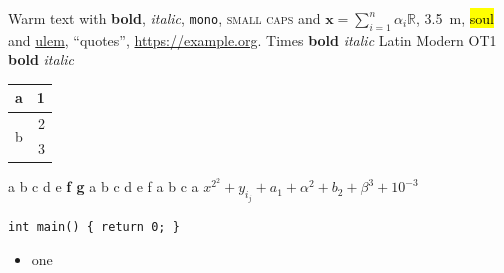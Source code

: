 \documentclass{article}
\begin{document}
Warm text with \textbf{bold}, \textit{italic}, \texttt{mono}, \textsc{small caps} and $\bm{x} = \sum_{i=1}^{n} \alpha_i
\mathbb{R}$, \SI{3.5}{\metre}, \hl{soul} and \uline{ulem}, \enquote{quotes}, \url{https://example.org}.
{\selectfont Times \textbf{bold} \textit{italic}} {\selectfont Latin Modern}
{\selectfont OT1 \textbf{bold} \textit{italic}}
\begin{tabular}{lr}\toprule a & 1 \\ \midrule \multirow{2}{*}{b} & 2 \\ & 3 \\ \bottomrule\end{tabular}
{\selectfont \fontsize{5}{6}\selectfont a \fontsize{6}{7}\selectfont b \fontsize{7}{8}\selectfont c \fontsize{8}{9}\selectfont d \fontsize{9}{10}\selectfont e \bfseries\fontsize{5}{6}\selectfont f \fontsize{7}{8}\selectfont g}
{\selectfont \fontsize{5}{6}\selectfont a \fontsize{6}{7}\selectfont b \fontsize{7}{8}\selectfont c \fontsize{8}{9}\selectfont d \fontsize{9}{10}\selectfont e \fontsize{10}{12}\selectfont f}
{\selectfont \fontsize{5}{6}\selectfont a \fontsize{7}{8}\selectfont b \fontsize{10}{12}\selectfont c}
{\selectfont \fontsize{10}{12}\selectfont a}
$x^{2^{2}} + y_{i_{j}} + {\scriptstyle a_1 + \alpha^2} + {\scriptscriptstyle b_2 + \beta^3} + 10^{-3}$
\begin{lstlisting}
int main() { return 0; }
\end{lstlisting}
\begin{itemize}[noitemsep]\item one\end{itemize}
\end{document}
